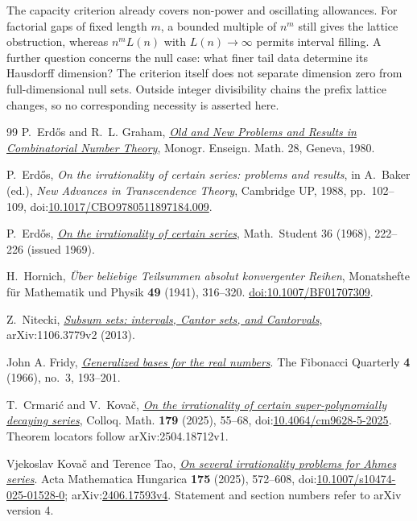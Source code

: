 \documentclass[11pt]{article}
\begin{document}
The capacity criterion already covers non-power and oscillating allowances.
For factorial gaps of fixed length $m$, a bounded multiple of $n^m$ still
gives the lattice obstruction, whereas $n^mL(n)$ with $L(n)\to\infty$
permits interval filling. A further question concerns the null case:
what finer tail data determine its Hausdorff dimension? The criterion itself
does not separate dimension zero from full-dimensional null sets. Outside
integer divisibility chains the prefix lattice changes, so no corresponding
necessity is asserted here.
\begin{thebibliography}{99}
 P.~Erd\H{o}s and R.~L. Graham,
  \href{https://mathweb.ucsd.edu/~ronspubs/80_11_number_theory.pdf}{\emph{Old
  and New Problems and Results in Combinatorial Number Theory}},
  Monogr. Enseign. Math. 28, Geneva, 1980.

 P.~Erd\H{o}s, \emph{On the irrationality of certain series:
  problems and results}, in A.~Baker (ed.), \emph{New Advances in Transcendence
  Theory}, Cambridge UP, 1988, pp.~102--109,
  doi:\href{https://doi.org/10.1017/CBO9780511897184.009}{10.1017/CBO9780511897184.009}.

 P.~Erd\H{o}s,
  \href{https://users.renyi.hu/~p_erdos/1969-09.pdf}{\emph{On the
  irrationality of certain series}}, Math.\ Student 36 (1968), 222--226
  (issued 1969).

H.~Hornich,
\emph{\"Uber beliebige Teilsummen absolut konvergenter Reihen},
Monatshefte f\"ur Mathematik und Physik \textbf{49} (1941), 316--320.
\href{https://doi.org/10.1007/BF01707309}{doi:10.1007/BF01707309}.

 Z.~Nitecki,
  \href{https://arxiv.org/abs/1106.3779v2}{\emph{Subsum sets: intervals, Cantor
  sets, and Cantorvals}}, arXiv:1106.3779v2 (2013).

 John A. Fridy, \href{https://www.fq.math.ca/Scanned/4-3/fridy.pdf}{\emph{Generalized bases for the real numbers}}.
  The Fibonacci Quarterly \textbf{4} (1966), no.~3, 193--201.

 T.~Crmari\'{c} and V.~Kova\v{c},
  \href{https://arxiv.org/abs/2504.18712v1}
  {\emph{On the irrationality of certain super-polynomially decaying series}},
  Colloq. Math. \textbf{179} (2025), 55--68,
  doi:\href{https://doi.org/10.4064/cm9628-5-2025}{10.4064/cm9628-5-2025}.
  Theorem locators follow arXiv:2504.18712v1.

 Vjekoslav Kova\v{c} and Terence Tao, \href{https://arxiv.org/abs/2406.17593v4}{\emph{On several irrationality problems for Ahmes series}}.
  Acta Mathematica Hungarica \textbf{175} (2025), 572--608, doi:\href{https://doi.org/10.1007/s10474-025-01528-0}{10.1007/s10474-025-01528-0}; arXiv:\href{https://arxiv.org/abs/2406.17593v4}{2406.17593v4}. Statement and section numbers refer to arXiv version 4.


\end{thebibliography}
\end{document}
